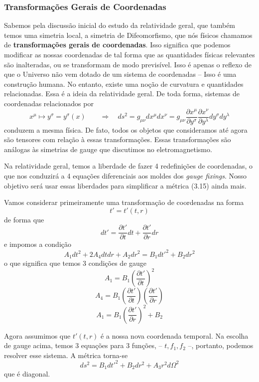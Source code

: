 \documentclass[11pt]{article}
\begin{document}
    \hypertarget{transformauxe7uxf5es-gerais-de-coordenadas}{%
\subsubsection{Transformações Gerais de
Coordenadas}\label{transformauxe7uxf5es-gerais-de-coordenadas}}

    Sabemos pela discussão inicial do estudo da relatividade geral, que
também temos uma simetria local, a simetria de Difeomorfismo, que nós
físicos chamamos de \textbf{transformações gerais de coordenadas}. Isso
significa que podemos modificar as nossas coordenadas de tal forma que
as quantidades físicas relevantes são inalteradas, ou se transformam de
modo previsível. Isso é apenas o reflexo de que o Universo não vem
dotado de um sistema de coordenadas -- Isso é uma construção humana. No
entanto, existe uma noção de curvatura e quantidades relacionadas. Essa
é a ideia da relatividade geral. De toda forma, sistemas de coordenadas
relacionados por
\[ \tag{3.16} x^\mu \mapsto y^\sigma = y^\sigma(x) \qquad \Rightarrow \quad ds^2 = g_{\mu\nu} dx^\mu dx^\nu = g_{\mu\nu} \frac{\partial x^\mu}{\partial y^\sigma} \frac{\partial x^\nu}{\partial y^\lambda} dy^\sigma dy^\lambda \]
conduzem a mesma física. De fato, todos os objetos que consideramos até
agora são tensores com relação à essas transformações. Essas
transformações são análogas às simetrias de gauge que discutimos no
eletromagnetismo.

Na relatividade geral, temos a liberdade de fazer 4 redefinições de
coordenadas, o que nos conduzirá a 4 equações diferenciais aos moldes
dos \emph{gauge fixings}. Nosso objetivo será usar essas liberdades para
simplificar a métrica (3.15) ainda mais.

    Vamos considerar primeiramente uma transformação de coordenadas na forma
\[ \tag{3.16.a} t' = t'(t,r) \] de forma que
\[ \tag{3.16.b} dt' = \frac{\partial t'}{\partial t} dt +  \frac{\partial t'}{\partial r} dr \]
e impomos a condição
\[ \tag{3.17} A_1 dt^2 + 2 A_4 dt dr + A_2 dr^2 = B_1 dt'^2 + B_2 dr^2 \]
o que significa que temos 3 condições de gauge
\[ \tag{3.18.a} A_1 = B_1 \left(\frac{\partial t'}{\partial t} \right)^2  \]
\[ \tag{3.18.a} A_4 = B_1 \left(\frac{\partial t'}{\partial t} \right) \left(\frac{\partial t'}{\partial r} \right)  \]
\[ \tag{3.18.a} A_1 = B_1 \left(\frac{\partial t'}{\partial r} \right)^2 + B_2  \]

Agora assumimos que \(t'(t,r)\) é a nossa nova coordenada temporal. Na
escolha de gauge acima, temos 3 equações para 3 funções, --
\(t, f_1, f_2\) --, portanto, podemos resolver esse sistema. A métrica
torna-se
\[ \tag{3.19} ds^2 = B_1 dt'^2 + B_2 dr^2 + A_3 r^2 d \Omega^2  \] que é
diagonal.
\end{document}
